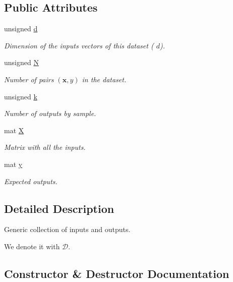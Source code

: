 \subsection*{Public Attributes}
\begin{DoxyCompactItemize}
\item 
unsigned \hyperlink{classhappyml_1_1DataSet_a0a154016e91e970cdd700e110f1cae80}{d}
\begin{DoxyCompactList}\small\item\em Dimension of the inputs vectors of this dataset ( $d$). \end{DoxyCompactList}\item 
unsigned \hyperlink{classhappyml_1_1DataSet_a18457530136087ab5e09e96125655ab5}{N}
\begin{DoxyCompactList}\small\item\em Number of pairs $(\mathbf{x}, y)$ in the dataset. \end{DoxyCompactList}\item 
unsigned \hyperlink{classhappyml_1_1DataSet_a23743c9bd5463966207e1199eba0c9d2}{k}
\begin{DoxyCompactList}\small\item\em Number of outputs by sample. \end{DoxyCompactList}\item 
mat \hyperlink{classhappyml_1_1DataSet_a692f8bd10b94c74df7e7f9010c78820a}{X}
\begin{DoxyCompactList}\small\item\em Matrix with all the inputs. \end{DoxyCompactList}\item 
mat \hyperlink{classhappyml_1_1DataSet_ac75419fb46abcc2841226a8441674d48}{y}
\begin{DoxyCompactList}\small\item\em Expected outputs. \end{DoxyCompactList}\end{DoxyCompactItemize}


\subsection{Detailed Description}
Generic collection of inputs and outputs. 

We denote it with $\mathcal{D}$. 

\subsection{Constructor \& Destructor Documentation}
